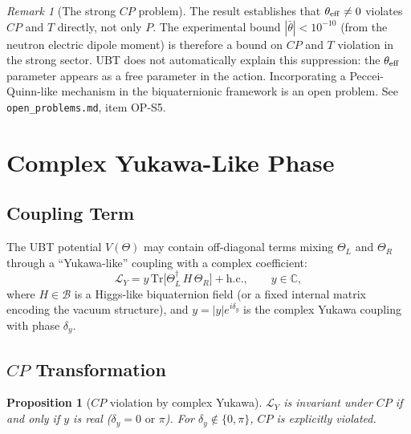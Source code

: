 \documentclass[12pt,a4paper]{article}
\newtheorem{proposition}[theorem]{Proposition}
\theoremstyle{definition}
\theoremstyle{remark}
\newtheorem{remark}[theorem]{Remark}
\begin{document}
\begin{remark}[The strong $CP$ problem]
The result establishes that $\theta_{\rm eff}\neq0$ violates $CP$ and $T$
directly, not only $P$.  The experimental bound $|\bar\theta|<10^{-10}$
(from the neutron electric dipole moment) is therefore a bound on $CP$ and
$T$ violation in the strong sector.  UBT does not automatically explain this
suppression: the $\theta_{\rm eff}$ parameter appears as a free parameter in
the action.  Incorporating a Peccei-Quinn-like mechanism in the biquaternionic
framework is an open problem.  See \texttt{open\_problems.md}, item OP-S5.
\end{remark}

\section{Complex Yukawa-Like Phase}
\label{sec:cp:yukawa}

\subsection{Coupling Term}

The UBT potential $V(\Theta)$ may contain off-diagonal terms mixing
$\Theta_L$ and $\Theta_R$ through a ``Yukawa-like'' coupling with
a complex coefficient:
\begin{equation}
  \mathcal{L}_Y
  = y\,\mathrm{Tr}\bigl[\Theta_L^\dagger\, H\, \Theta_R\bigr] + \mathrm{h.c.},
  \qquad y \in \mathbb{C},
  \label{eq:cp:yukawa}
\end{equation}
where $H \in \mathcal{B}$ is a Higgs-like biquaternion field (or a fixed
internal matrix encoding the vacuum structure), and $y = |y|e^{i\delta_y}$
is the complex Yukawa coupling with phase $\delta_y$.

\subsection{$CP$ Transformation}

\begin{proposition}[$CP$ violation by complex Yukawa]
\label{prop:cp:yukawa_CP}
$\mathcal{L}_Y$ is invariant under $CP$ if and only if $y$ is real
($\delta_y = 0\text{ or }\pi$).
For $\delta_y\notin\{0,\pi\}$, $CP$ is explicitly violated.
\end{proposition}
\end{document}
